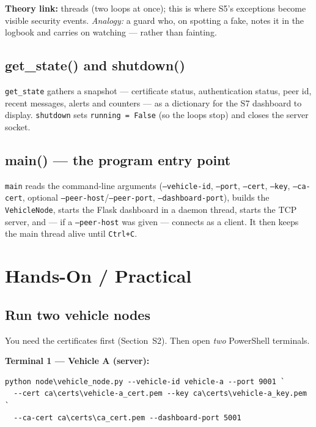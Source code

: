 \documentclass[11pt,a4paper]{article}
\begin{document}
\textbf{Theory link:} threads (two loops at once); this is where S5's exceptions
become visible security events. \emph{Analogy:} a guard who, on spotting a fake,
notes it in the logbook and carries on watching --- rather than fainting.

\subsection{get\_state() and shutdown()}
\texttt{get\_state} gathers a snapshot --- certificate status, authentication
status, peer id, recent messages, alerts and counters --- as a dictionary for the
S7 dashboard to display. \texttt{shutdown} sets \texttt{running = False} (so the
loops stop) and closes the server socket.

\subsection{main() --- the program entry point}
\texttt{main} reads the command-line arguments (\texttt{--vehicle-id},
\texttt{--port}, \texttt{--cert}, \texttt{--key}, \texttt{--ca-cert},
optional \texttt{--peer-host}/\texttt{--peer-port}, \texttt{--dashboard-port}),
builds the \texttt{VehicleNode}, starts the Flask dashboard in a daemon thread,
starts the TCP server, and --- if a \texttt{--peer-host} was given --- connects
as a client. It then keeps the main thread alive until \texttt{Ctrl+C}.

\section{Hands-On / Practical}

\subsection{Run two vehicle nodes}
You need the certificates first (Section~S2). Then open \emph{two} PowerShell
terminals.

\textbf{Terminal 1 --- Vehicle A (server):}
\begin{lstlisting}[style=term]
python node\vehicle_node.py --vehicle-id vehicle-a --port 9001 `
  --cert ca\certs\vehicle-a_cert.pem --key ca\certs\vehicle-a_key.pem `
  --ca-cert ca\certs\ca_cert.pem --dashboard-port 5001
\end{lstlisting}
\end{document}
